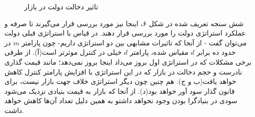 \documentclass[13pt,onecolumn,a4paper]{article}
\begin{document}
\begin{figure}[H]
	\medskip
	\hfil
	\caption{تاثیر دخالت دولت در بازار}
	\label{fig:myfigure}
\end{figure}
شش سنجه تعریف شده در شکل ۶، اینجا نیز مورد بررسی قرار می‌گیرند تا صرفه و عملکرد استراتژی دولت را مورد بررسی قرار دهند. در قیاس با استراتژی قبلی دولت می‌توان گفت - از آنجا که تاثیرات مشابهی بین دو استراتژی داریم- چون پارامتر $m$ در حدود ده برابر $d$ مقیاس شده، پارامتر $d$ خیلی در کنترل موثرتر است(آ). از طرفی برخی مشکلات که در استراتژی اول بروز می‌داد اینجا بروز نمی‌دهد؛ مانند قیمت گذاری نادرست و حجم دخالت در بازار که در این استراتژی با افزایش پارامتر کنترل کاهش خواهد یافت(ب و ج). هم چنین چون دیگر استراتژی خلاف جهت بازار نیست، برای قانون گذار سود آور خواهد بود(د). از آنجا که بازار به قیمت بنیادی نزدیک می‌شود سودی در بنیادگرا بودن وجود نخواهد داشتو به همین دلیل تعداد آن‌ها کاهش خواهد داشت.
\end{document}
